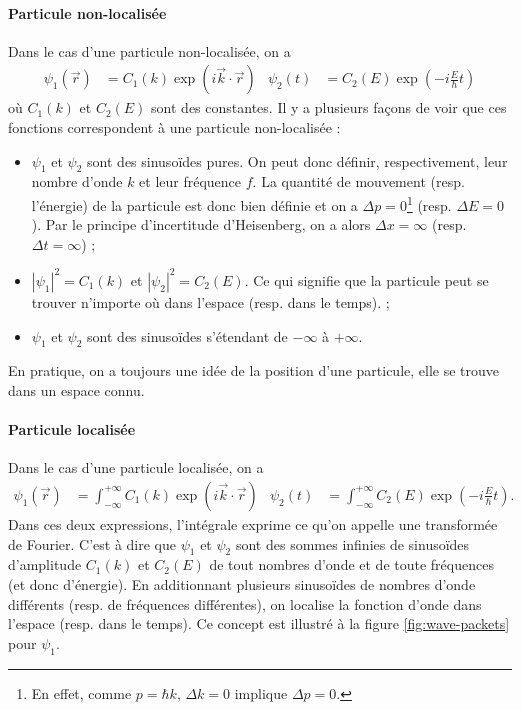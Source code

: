 \paragraph{Particule non-localisée}
Dans le cas d'une particule non-localisée, on a
\begin{align*}
\psi_1(\vec{r}) &= C_1(k)\exp(i\vec{k}\cdot\vec{r})
& \psi_2(t) &= C_2(E)\exp(-i\frac{E}{\hbar}t)
\end{align*}
où $C_1(k)$ et $C_2(E)$ sont des constantes.
Il y a plusieurs façons de voir que ces fonctions
correspondent à une particule non-localisée :
\begin{itemize}
	\item $\psi_1$ et $\psi_2$ sont des sinusoïdes
	pures. On peut donc définir, respectivement,
	leur nombre d'onde $k$ et leur fréquence $f$.
	La quantité de mouvement (resp. l'énergie) de
	la particule est donc bien définie
	et on a $\Delta p = 0$\footnote{En effet,
	comme $p = \hbar k$, $\Delta k = 0$ implique $\Delta p = 0$.}
	(resp. $\Delta E = 0$). Par le
	principe d'incertitude d'Heisenberg, on a alors
	$\Delta x = \infty$ (resp. $\Delta t = \infty$) ;
	\item $|\psi_1|^2 = C_1(k)$ et $|\psi_2|^2 = C_2(E)$. Ce
	qui signifie que la particule peut se trouver
	n'importe où dans l'espace (resp. dans le temps). ;
	\item $\psi_1$ et $\psi_2$ sont des sinusoïdes
	s'étendant de $-\infty$ à $+\infty$.
\end{itemize}
En pratique, on a toujours une idée de la
position d'une particule, elle se trouve dans
un espace connu.

\paragraph{Particule localisée}
Dans le cas d'une particule localisée, on a
\begin{align*}
\psi_1(\vec{r}) &= \int_{-\infty}^{+\infty} C_1(k)\exp(i\vec{k}\cdot\vec{r})
& \psi_2(t) &= \int_{-\infty}^{+\infty} C_2(E)\exp(-i\frac{E}{\hbar}t).
\end{align*}
Dans ces deux expressions, l'intégrale exprime ce qu'on
appelle une transformée de Fourier. C'est à dire que
$\psi_1$ et $\psi_2$ sont des sommes infinies de sinusoïdes
d'amplitude $C_1(k)$ et $C_2(E)$ de tout nombres d'onde et
de toute fréquences (et donc d'énergie).
En additionnant plusieurs sinusoïdes de nombres d'onde
différents (resp. de fréquences différentes),
on localise la fonction d'onde dans l'espace (resp.
dans le temps). Ce concept est illustré à la figure
\ref{fig:wave-packets} pour $\psi_1$.

